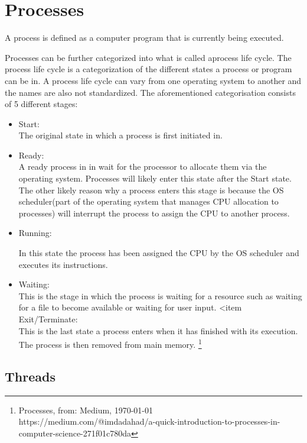 \section{Processes}

A process is defined as a computer program that is currently being executed. 

Processes can be further categorized into what is called aprocess life cycle. The process life cycle is
a categorization of the different states a process or program can be in. A process life cycle can vary
from one operating system to another and the names are also not standardized. The aforementioned 
categorisation consists of 5 different stages:


\begin{itemize}
\item Start: \\

The original state in which a process is first initiated in.
\item Ready: \\

A ready process in in wait for the processor to allocate them via the operating system. Processes will
likely enter this state after the Start state. The other likely reason why a process enters this stage
is because the OS scheduler(part of the operating system that manages CPU allocation to processes) will
interrupt the process to assign the CPU to another process.
\item Running:

In this state the process has been assigned the CPU by the OS scheduler and executes its instructions.
\item Waiting: \\

This is the stage in which the process is waiting for a resource such as waiting for a file to become available
or waiting for user input.
<item Exit/Terminate: \\

This is the last state a process enters when it has finished with its execution. The process is then removed
from main memory. \footnote{Processes, from: Medium, \today   \\ https://medium.com/@imdadahad/a-quick-introduction-to-processes-in-computer-science-271f01c780da}

\end{itemize}

\subsection{Threads}

